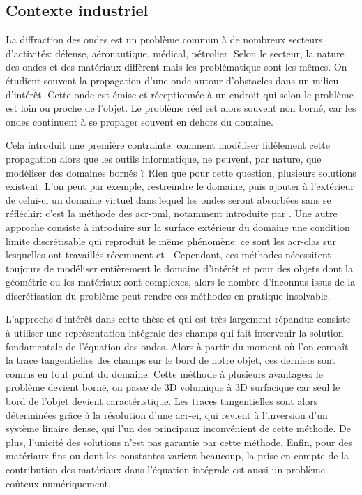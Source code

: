 \subsection*{Contexte industriel}
La diffraction des ondes est un problème commun à de nombreux secteurs d'activités: défense, aéronautique, médical, pétrolier.
Selon le secteur, la nature des ondes et des matériaux diffèrent mais les problématique sont les mêmes.
On étudient souvent la propagation d'une onde autour d'obstacles dans un milieu d’intérêt.
Cette onde est émise et réceptionnée à un endroit qui selon le problème est loin ou proche de l'objet.
Le problème réel est alors souvent non borné, car les ondes continuent à se propager souvent en dehors du domaine.

Cela introduit une première contrainte: comment modéliser fidèlement cette propagation alors que les outils informatique, ne peuvent, par nature, que modéliser des domaines bornés ?
Rien que pour cette question, plusieurs solutions existent.
L'on peut par exemple, restreindre le domaine, puis ajouter à l'extérieur de celui-ci un domaine virtuel dans lequel les ondes seront absorbées sans se réfléchir: c'est la méthode des \gls{acr-pml}, notamment introduite par \cite{berenger_perfectly_1994}.
Une autre approche consiste à introduire sur la surface extérieur du domaine une condition limite discrétisable qui reproduit le même phénomène: ce sont les \glspl{acr-cla} sur lesquelles ont travaillés récemment \cite{barucq_etude_1993} et \cite{duprat_conditions_2011}.
Cependant, ces méthodes nécessitent toujours de modéliser entièrement le domaine d’intérêt et pour des objets dont la géométrie ou les matériaux sont complexes, alors le nombre d'inconnus issus de la discrétisation du problème peut rendre ces méthodes en pratique insolvable.

L'approche d’intérêt dans cette thèse et qui est très largement répandue consiste à utiliser une représentation intégrale des champs qui fait intervenir la solution fondamentale de l'équation des ondes.
Alors à partir du moment où l'on connaît la trace tangentielles des champs sur le bord de notre objet, ces derniers sont connus en tout point du domaine.
Cette méthode à plusieurs avantages: le problème devient borné, on passe de 3D volumique à 3D surfacique car seul le bord de l'objet devient caractéristique.
Les traces tangentielles sont alors déterminées grâce à la résolution d'une \gls{acr-ei}, qui revient à l'inversion d'un système linaire dense, qui l'un des principaux inconvénient de cette méthode.
De plus, l'unicité des solutions n'est pas garantie par cette méthode.
Enfin, pour des matériaux fins ou dont les constantes varient beaucoup, la prise en compte de la contribution des matériaux dans l'équation intégrale est aussi un problème coûteux numériquement.

